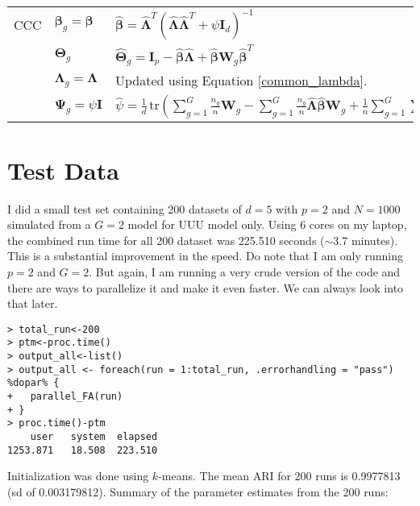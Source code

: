 \documentclass[12pt]{article}
\newcommand{\bI}{\mathbf{I}}
\newcommand{\bW}{\mathbf{W}}
\newcommand{\bbeta}{\boldsymbol{\beta}}
\newcommand{\bTheta}{\boldsymbol{\Theta}}
\newcommand{\bLambda}{\boldsymbol{\Lambda}}
\newcommand{\bPsi}{\boldsymbol{\Psi}}
\newcommand{\tr}{\,\mbox{tr}}
\begin{document}
\begin{longtable}{p{}  p{}p{}}
\\
CCC & $\bbeta_g=\bbeta$& $\hat{\bbeta}=\hat{\bLambda}^T(\hat{\bLambda}\hat{\bLambda}^T+\psi\bI_d)^{-1}$\\
&$\bTheta_g$   & $\hat{\bTheta}_g=\bI_p -\hat{\bbeta}\hat{\bLambda}+\hat{\bbeta}\bW_g\hat{\bbeta}^T$\\
&$\bLambda_g=\bLambda$&  Updated using Equation \ref{common_lambda}.    \\
&$\bPsi_g=\psi\bI$&$\hat{\psi}=\frac{1}{d}\tr\left(\sum_{g=1}^G\frac{n_g}{n}\bW_g-\sum_{g=1}^G\frac{n_g}{n}\hat{\bLambda}\hat{\bbeta}\bW_g+\frac{1}{n}\sum_{g=1}^G\sum_{i=1}^nz_{ig}\mathbf{S}_{ig}\right)$ \\
\hline
\end{longtable}

\section{Test Data}
I did a small test set containing 200 datasets of $d=5$ with $p=2$ and $N=1000$ simulated from a $G=2$ model for UUU model only. Using 6 cores on my laptop, the combined run time for all 200 dataset was 225.510 seconds ($\sim$3.7 minutes). This is a substantial improvement in the speed. Do note that I am only running $p=2$ and $G=2$. But again, I am running a very crude version of the code and there are ways to parallelize it and make it even faster. We can always look into that later.

\begin{verbatim}
> total_run<-200
> ptm<-proc.time()
> output_all<-list()
> output_all <- foreach(run = 1:total_run, .errorhandling = "pass") %dopar% {
+   parallel_FA(run)
+ }
> proc.time()-ptm
    user   system  elapsed 
1253.871   18.508  223.510 
\end{verbatim}
Initialization was done using $k$-means. The mean ARI for 200 runs is  0.9977813 (sd of 0.003179812). Summary of the parameter estimates from the 200 runs:
\end{document}
